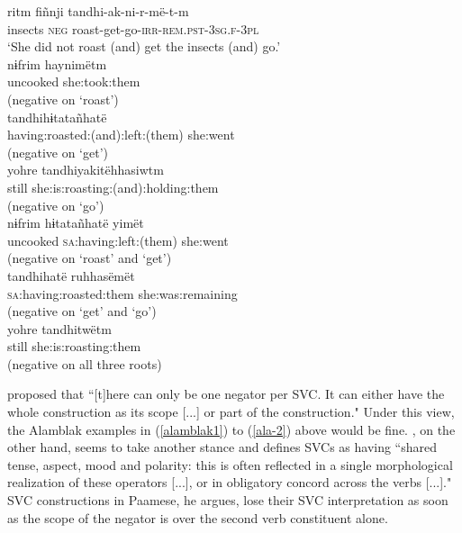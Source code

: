 \ea 
{}
\ea \label{alamblak1}
\gll ritm fiñnji tandhi-ak-ni-r-më-t-m \\
insects \textsc{neg} roast-get-go-\textsc{irr}-\textsc{rem}.\textsc{pst}-\textsc{3}\textsc{sg}.\textsc{f}-\textsc{3}\textsc{pl} \\
\glft `She did not roast (and) get the insects (and) go.' \\ 
\ex \label{ala-1}
\gll nɨfrim haynimëtm \\
uncooked she:took:them \\
\glft (negative on `roast') \\ 
\ex
\gll tandhihɨtatañhatë \\
having:roasted:(and):left:(them) she:went \\
\glft (negative on `get') \\ 
\ex
\gll yohre tandhiyakitëhhasiwtm \\
still she:is:roasting:(and):holding:them \\
\glft (negative on `go') \\ 
\ex
\gll nɨfrim hɨtatañhatë yimët \\
uncooked \textsc{sa}:having:left:(them) she:went \\
\glft (negative on `roast' and `get') \\ 
\ex
\gll tandhihatë ruhhasëmët \\
\textsc{sa}:having:roasted:them she:was:remaining \\
\glft (negative on `get' and `go') \\ 
\ex \label{ala-2}
\gll yohre tandhitwëtm \\ 
still she:is:roasting:them \\
\glft (negative on all three roots)\\ 
\z
\z

\citet{Aikhenvald2006} proposed that ``[t]here can only be one negator per SVC. It can either have the whole construction as its scope [...] or part of the construction." Under this view, the Alamblak examples in (\ref{alamblak1}) to (\ref{ala-2}) above would be fine. \citet[293]{Durie1997}, on the other hand, seems to take another stance and defines SVCs as having ``shared tense, aspect, mood and polarity: this is often reflected in a single morphological realization of these operators [...], or in obligatory concord across the verbs [...]." SVC constructions in Paamese, he argues, lose their SVC interpretation as soon as the scope of the negator is over the second verb constituent alone.


